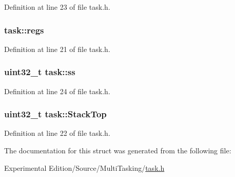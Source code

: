 Definition at line 23 of file task.\+h.

\subsubsection[{\texorpdfstring{regs}{regs}}]{ task\+::regs}\hypertarget{structtask_a682bd33719ea3bc948375a5c51e91e4b}{}\label{structtask_a682bd33719ea3bc948375a5c51e91e4b}


Definition at line 21 of file task.\+h.

\subsubsection[{\texorpdfstring{ss}{ss}}]{\setlength{\rightskip}{0pt plus 5cm}uint32\+\_\+t task\+::ss}\hypertarget{structtask_a9acefcf2fef4e255ec63a180f8ba6aea}{}\label{structtask_a9acefcf2fef4e255ec63a180f8ba6aea}


Definition at line 24 of file task.\+h.

\subsubsection[{\texorpdfstring{Stack\+Top}{StackTop}}]{\setlength{\rightskip}{0pt plus 5cm}uint32\+\_\+t task\+::\+Stack\+Top}\hypertarget{structtask_a9a1171f8e45d2c08d5a70290b94c5a6f}{}\label{structtask_a9a1171f8e45d2c08d5a70290b94c5a6f}


Definition at line 22 of file task.\+h.



The documentation for this struct was generated from the following file\+:\begin{DoxyCompactItemize}
\item 
Experimental Edition/\+Source/\+Multi\+Tasking/\hyperlink{task_8h}{task.\+h}\end{DoxyCompactItemize}
